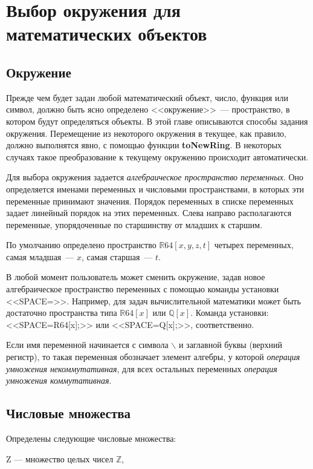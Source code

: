 \chapter{Выбор окружения для математических объектов}

\section{Окружение}
  Прежде чем будет задан любой математический объект,  число,  функция или символ,  должно быть ясно определено <<окружение>>~--- пространство,  
в котором будут определяться объекты.  
В этой главе описываются способы задания окружения.  Перемещение из некоторого окружения в текущее,  как правило,  должно выполнятся явно,  с помощью функции {\bf toNewRing}.  В некоторых случаях такое преобразование к текущему окружению происходит автоматически.  

Для выбора окружения задается {\it алгебраическое пространство переменных}.  Оно
определяется именами переменных и числовыми пространствами,  в которых эти
переменные принимают значения.  Порядок переменных в списке переменных задает линейный порядок на этих переменных.  Слева направо располагаются переменные,  упорядоченные по старшинству от младших к старшим. 

По умолчанию определено пространство  $\mathbb{R}64[x,y,z,t]$ четырех переменных,   самая младшая~--- $x$,  самая старшая~--- $t$. 

В любой момент пользователь может сменить окружение,  задав новое алгебраическое пространство переменных с помощью команды установки <<SPACE=>>.  Например,  для задач вычислительной математики может быть достаточно пространства типа $\mathbb{R}64[x]$ или  $\mathbb{Q}[x]$.  Команда установки: <<SPACE=R64[x];>> или <<SPACE=Q[x];>>, соответственно. 

Если имя переменной начинается с символа $\backslash$ и заглавной буквы (верхний регистр), 
то такая переменная обозначает элемент алгебры, у которой {\it операция умножения некоммутативная},  для всех остальных переменных {\it операция умножения коммутативная}. 





\section{Числовые множества}
Определены следующие числовые множества:

Z --- множество целых чисел ${\mathbb Z}$, 

